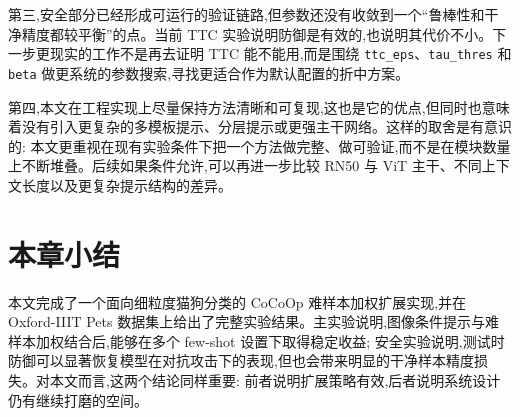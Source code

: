 第三,安全部分已经形成可运行的验证链路,但参数还没有收敛到一个“鲁棒性和干净精度都较平衡”的点。当前 TTC 实验说明防御是有效的,也说明其代价不小。下一步更现实的工作不是再去证明 TTC 能不能用,而是围绕 \texttt{ttc\_eps}、\texttt{tau\_thres} 和 \texttt{beta} 做更系统的参数搜索,寻找更适合作为默认配置的折中方案。

第四,本文在工程实现上尽量保持方法清晰和可复现,这也是它的优点,但同时也意味着没有引入更复杂的多模板提示、分层提示或更强主干网络。这样的取舍是有意识的: 本文更重视在现有实验条件下把一个方法做完整、做可验证,而不是在模块数量上不断堆叠。后续如果条件允许,可以再进一步比较 RN50 与 ViT 主干、不同上下文长度以及更复杂提示结构的差异。

\section{本章小结}

本文完成了一个面向细粒度猫狗分类的 CoCoOp 难样本加权扩展实现,并在 Oxford-IIIT Pets 数据集上给出了完整实验结果。主实验说明,图像条件提示与难样本加权结合后,能够在多个 few-shot 设置下取得稳定收益; 安全实验说明,测试时防御可以显著恢复模型在对抗攻击下的表现,但也会带来明显的干净样本精度损失。对本文而言,这两个结论同样重要: 前者说明扩展策略有效,后者说明系统设计仍有继续打磨的空间。
